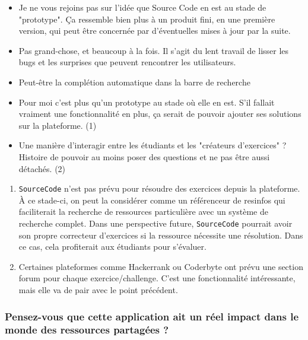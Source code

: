 \begin{itemize}
    \item Je ne vous rejoins pas sur l'idée que Source Code en est au stade de "prototype". Ça ressemble bien plus à un produit fini, en une première version, qui peut être concernée par d'éventuelles mises à jour par la suite.
    \item Pas grand-chose, et beaucoup à la fois. Il s'agit du lent travail de lisser les bugs et les surprises que peuvent rencontrer les utilisateurs.
    \item Peut-être la complétion automatique dans la barre de recherche
    \item Pour moi c'est plus qu'un prototype au stade où elle en est. S'il fallait vraiment une fonctionnalité en plus, ça serait de pouvoir ajouter ses solutions sur la plateforme. (1)
    \item Une manière d'interagir entre les étudiants et les "créateurs d'exercices" ? Histoire de pouvoir au moins poser des questions et ne pas être aussi détachés. (2)
\end{itemize}
\bigskip
\begin{enumerate}
    \item \texttt{SourceCode} n'est pas prévu pour résoudre des exercices depuis la plateforme. À ce stade-ci, on peut la considérer comme un référenceur de \glspl{resinfo} qui faciliterait la recherche de ressources particulière avec un système de recherche complet. Dans une perspective future, \texttt{SourceCode} pourrait avoir son propre correcteur d'exercices si la ressource nécessite une résolution. Dans ce cas, cela profiterait aux étudiants pour s'évaluer.
    \item Certaines plateformes comme Hackerrank ou Coderbyte ont prévu une section forum pour chaque exercice/challenge. C'est une fonctionnalité intéressante, mais elle va de pair avec le point précédent.
\end{enumerate}

\subsubsection*{Pensez-vous que cette application ait un réel impact dans le monde des ressources partagées ?}


